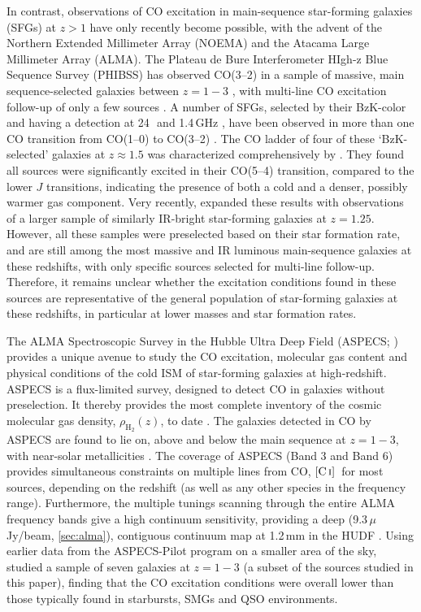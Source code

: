 \documentclass[twocolumn]{aastex62}
\newcommand{\HH}{\ensuremath{\mathrm{H}_{2}}}
\newcommand{\rhoHH}{\ensuremath{\rho_{\HH}}}
\newcommand{\CI}{\ensuremath{\mathrm{[C\, \textsc{i}]}}}
\begin{document}
In contrast, observations of CO excitation in main-sequence star-forming
galaxies (SFGs) at $z>1$ have only recently become possible, with the advent of
the Northern Extended Millimeter Array (NOEMA) and the Atacama Large Millimeter
Array (ALMA).  The Plateau de Bure Interferometer HIgh-z Blue Sequence Survey
(PHIBSS) has observed CO(3--2) in a sample of massive, main sequence-selected
galaxies between $z=1-3$ \citep{Genzel2010, Genzel2015, Tacconi2010,
  Tacconi2013, Tacconi2018}, with multi-line CO excitation follow-up of only a
few sources \citep{Bolatto2015, Brisbin2019}.  A number of SFGs, selected by
their BzK-color \citep{Daddi2004} and having a detection at 24\,\micron\ and
1.4\,GHz \citep{Daddi2010}, have been observed in more than one CO transition
from CO(1--0) to CO(3--2) \citep{Dannerbauer2009, Daddi2010, Aravena2010,
  Aravena2014}.  The CO ladder of four of these `BzK-selected' galaxies at
$z\approx1.5$ was characterized comprehensively by \cite{Daddi2015}.  They
found all sources were significantly excited in their CO(5--4) transition,
compared to the lower $J$ transitions, indicating the presence of both a cold
and a denser, possibly warmer gas component.  Very recently,
\cite{Valentino2020b} expanded these results with observations of a larger
sample of similarly IR-bright star-forming galaxies at $z=1.25$.  However, all
these samples were preselected based on their star formation rate, and are
still among the most massive and IR luminous main-sequence galaxies at these
redshifts, with only specific sources selected for multi-line follow-up.
Therefore, it remains unclear whether the excitation conditions found in these
sources are representative of the general population of star-forming galaxies
at these redshifts, in particular at lower masses and star formation rates.

The ALMA Spectroscopic Survey in the Hubble Ultra Deep Field (ASPECS;
\citealt{Walter2016}) provides a unique avenue to study the CO excitation,
molecular gas content and physical conditions of the cold ISM of star-forming
galaxies at high-redshift.  ASPECS is a flux-limited survey, designed to detect
CO in galaxies without preselection.  It thereby provides the most complete
inventory of the cosmic molecular gas density, $\rhoHH(z)$, to date
\citep{Decarli2016a, Decarli2019, Decarli2020}.  The galaxies detected in CO by
ASPECS are found to lie on, above and below the main sequence at $z=1-3$, with
near-solar metallicities \citep{Aravena2019, Boogaard2019}.  The coverage of
ASPECS (Band 3 and Band 6) provides simultaneous constraints on multiple lines
from CO, \CI\ for most sources, depending on the redshift (as well as any other
species in the frequency range).  Furthermore, the multiple tunings scanning
through the entire ALMA frequency bands give a high continuum sensitivity,
providing a deep (9.3\,$\mu$Jy/beam, \autoref{sec:alma}), contiguous continuum
map at 1.2\,mm in the HUDF \citep{Gonzalez-Lopez2020, Aravena2020}.  Using
earlier data from the ASPECS-Pilot program on a smaller area of the sky,
\cite{Decarli2016b} studied a sample of seven galaxies at $z=1-3$ (a subset of
the sources studied in this paper), finding that the CO excitation conditions
were overall lower than those typically found in starbursts, SMGs and QSO
environments.
\end{document}
